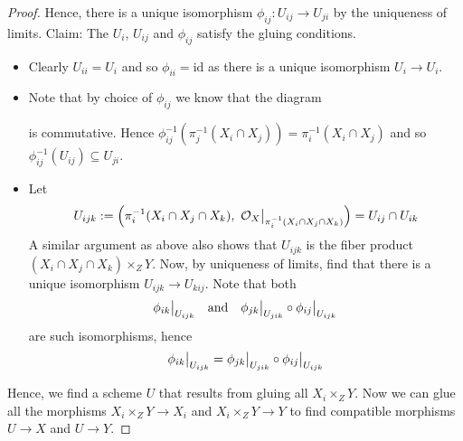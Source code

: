 \documentclass{scrartcl}
\renewcommand{\O}{\mathcal{O}}
\newcommand\restr[2]{{
    \left.\kern-\nulldelimiterspace
    #1
    \vphantom{\big|}
    \right|_{#2}
}}
\theoremstyle{definition}
\begin{document}
\begin{proof}
    Hence, there is a unique isomorphism $\phi_{ij}: U_{ij} \to U_{ji}$ by the uniqueness of limits.
    Claim: The $U_i$, $U_{ij}$ and $\phi_{ij}$ satisfy the gluing conditions.
    \begin{itemize}
        \item Clearly $U_{ii} = U_i$ and so $\phi_{ii} = \mathrm{id}$ as there is a unique isomorphism $U_i \to U_i$.
        \item Note that by choice of $\phi_{ij}$ we know that the diagram
        \begin{center}
        \end{center}
        is commutative.
        Hence $\phi_{ij}^{-1}(\pi_j^{-1}(X_i \cap X_j)) = \pi_i^{-1}(X_i \cap X_j)$ and so $\phi_{ij}^{-1}(U_{ij}) \subseteq U_{ji}$.
        \item Let
        \begin{equation*}
            U_{ijk} := \Bigl( \pi_i^{-1}(X_i \cap X_j \cap X_k), \ \restr{\O_{X}}{\pi_i^{-1}(X_i \cap X_j \cap X_k)} \Bigr) = U_{ij} \cap U_{ik}
        \end{equation*}
        A similar argument as above also shows that $U_{ijk}$ is the fiber product $(X_i \cap X_j \cap X_k) \times_Z Y$.
        Now, by uniqueness of limits, find that there is a unique isomorphism $U_{ijk} \to U_{kij}$.
        Note that both
        \begin{equation*}
            \restr{\phi_{ik}}{U_{ijk}} \quad \text{and} \quad \restr{\phi_{jk}}{U_{jik}} \circ \restr{\phi_{ij}}{U_{ijk}}
        \end{equation*}
        are such isomorphisms, hence 
        \begin{equation*}
            \restr{\phi_{ik}}{U_{ijk}} = \restr{\phi_{jk}}{U_{jik}} \circ \restr{\phi_{ij}}{U_{ijk}}
        \end{equation*}
    \end{itemize}
    Hence, we find a scheme $U$ that results from gluing all $X_i \times_Z Y$.
    Now we can glue all the morphisms $X_i \times_Z Y \to X_i$ and $X_i \times_Z Y \to Y$ to find compatible morphisms $U \to X$ and $U \to Y$.
    

\end{proof}
\end{document}
